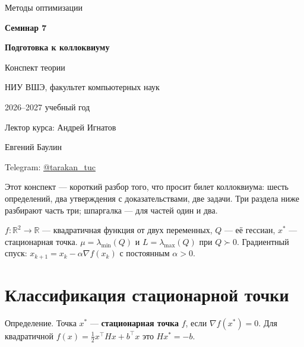 \documentclass[11pt,a4paper]{article}
\begin{document}
\begin{center}
  {\large\color{hsegray}Методы оптимизации\par}
  \vspace{4pt}
  {\large\bfseries\color{hseaccent}Семинар 7\par}
  \vspace{8pt}
  {\LARGE\bfseries\color{hseblue}Подготовка к коллоквиуму\par}
  \vspace{8pt}
  {\Large Конспект теории\par}
  \vspace{12pt}
  НИУ ВШЭ, факультет компьютерных наук\par
  2026--2027 учебный год\par
  \vspace{8pt}
  Лектор курса: Андрей Игнатов\par
  Евгений Баулин\par
  Telegram: \href{https://t.me/tarakan_tuc}{@tarakan\_tuc}\par
\end{center}

\noindent{\color{hseblue}\rule{\linewidth}{0.6pt}}

\tableofcontents

\clearpage

Этот конспект — короткий разбор того, что просит билет коллоквиума: шесть определений, два утверждения с доказательствами, две задачи. Три раздела ниже разбирают часть три; шпаргалка — для частей один и два.

\begin{conventionbox}
$f:\mathbb R^2\to\mathbb R$ — квадратичная функция от двух переменных, $Q$ — её гессиан, $x^*$ — стационарная точка. $\mu=\lambda_{\min}(Q)$ и $L=\lambda_{\max}(Q)$ при $Q\succ0$. Градиентный спуск: $x_{k+1}=x_k-\alpha\nabla f(x_k)$ с постоянным $\alpha>0$.
\end{conventionbox}

\section{Классификация стационарной точки}\label{sec:classify}

\begin{definitionbox}{Определение.}
Точка $x^*$ — \textbf{стационарная точка} $f$, если $\nabla f(x^*)=0$. Для квадратичной $f(x)=\tfrac{1}{2}x^\top Hx+b^\top x$ это $Hx^*=-b$.
\end{definitionbox}
\end{document}
